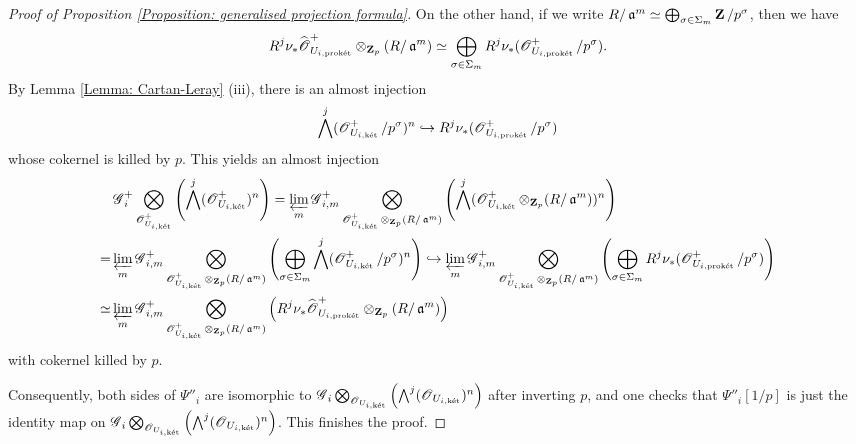 \begin{proof}[Proof of Proposition \ref{Proposition: generalised projection formula}]
On the other hand, if we write $R/\fraka^m\simeq \bigoplus_{\sigma\in \Sigma_m} \Z/p^{\sigma}$, then we have
$$R^j\nu_*\widehat{\scrO}^+_{U_{i,\proket}}\otimes_{\Z_p} (R/\fraka^m)\simeq \bigoplus_{\sigma\in \Sigma_m} R^j\nu_* (\scrO^+_{U_{i,\proket}}/p^{\sigma}).$$
By Lemma \ref{Lemma: Cartan-Leray} (iii), there is an almost injection
$$\bigwedge^j (\scrO^+_{U_{i,\ket}}/p^{\sigma})^n\hookrightarrow R^j\nu_*(\scrO^+_{U_{i,\proket}}/p^{\sigma})$$ 
whose cokernel is killed by $p$. This yields an almost injection
\begin{align*}
&\scrG^+_i\bigotimes_{\scrO^+_{U_{i,\ket}}}\left(\bigwedge^j(\scrO^+_{U_{i,\ket}})^n\right)=\varprojlim_m\scrG^+_{i,m}\bigotimes_{\scrO^+_{U_{i,\ket}}\otimes_{\Z_p}(R/\fraka^m)}\left(\bigwedge^j (\scrO^+_{U_{i,\ket}}\otimes_{\Z_p}(R/\fraka^m))^n\right)\\
=& \varprojlim_m\scrG^+_{i,m}\bigotimes_{\scrO^+_{U_{i,\ket}}\otimes_{\Z_p}(R/\fraka^m)}\left(\bigoplus_{\sigma\in \Sigma_m}\bigwedge^j (\scrO^+_{U_{i,\ket}}/p^{\sigma})^n\right)\hookrightarrow \varprojlim_m\scrG^+_{i,m}\bigotimes_{\scrO^+_{U_{i,\ket}}\otimes_{\Z_p}(R/\fraka^m)}\left(\bigoplus_{\sigma\in \Sigma_m} R^j\nu_*(\scrO^+_{U_{i,\proket}}/p^{\sigma})\right)\\
\simeq & \varprojlim_m\scrG^+_{i,m}\bigotimes_{\scrO^+_{U_{i,\ket}}\otimes_{\Z_p}(R/\fraka^m)}\left(R^j\nu_*\widehat{\scrO}^+_{U_{i,\proket}}\otimes_{\Z_p} (R/\fraka^m)\right)
\end{align*}
with cokernel killed by $p$. 

Consequently, both sides of $\Psi''_i$ are isomorphic to $\scrG_i\bigotimes_{\scrO_{U_{i,\ket}}}\left(\bigwedge^j(\scrO_{U_{i,\ket}})^n\right)$ after inverting $p$, and one checks that $\Psi''_i[1/p]$ is just the identity map on $\scrG_i\bigotimes_{\scrO_{U_{i,\ket}}}\left(\bigwedge^j(\scrO_{U_{i,\ket}})^n\right)$. This finishes the proof.
\end{proof}


